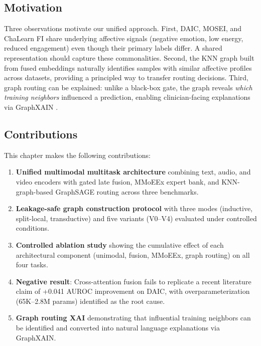 \documentclass[12pt,oneside]{book}
\begin{document}
\subsection{Motivation}

Three observations motivate our unified approach. First, DAIC, MOSEI, and ChaLearn FI share underlying affective signals (negative emotion, low energy, reduced engagement) even though their primary labels differ. A shared representation should capture these commonalities. Second, the KNN graph built from fused embeddings naturally identifies samples with similar affective profiles across datasets, providing a principled way to transfer routing decisions. Third, graph routing can be explained: unlike a black-box gate, the graph reveals \emph{which training neighbors} influenced a prediction, enabling clinician-facing explanations via GraphXAIN \citep{cedro2024graphxain}.

\subsection{Contributions}

This chapter makes the following contributions:

\begin{enumerate}
    \item \textbf{Unified multimodal multitask architecture} combining text, audio, and video encoders with gated late fusion, MMoEEx expert bank, and KNN-graph-based GraphSAGE routing across three benchmarks.

    \item \textbf{Leakage-safe graph construction protocol} with three modes (inductive, split-local, transductive) and five variants (V0--V4) evaluated under controlled conditions.

    \item \textbf{Controlled ablation study} showing the cumulative effect of each architectural component (unimodal, fusion, MMoEEx, graph routing) on all four tasks.

    \item \textbf{Negative result}: Cross-attention fusion fails to replicate a recent literature claim of +0.041 AUROC improvement on DAIC, with overparameterization (65K--2.8M params) identified as the root cause.

    \item \textbf{Graph routing XAI} demonstrating that influential training neighbors can be identified and converted into natural language explanations via GraphXAIN.
\end{enumerate}
\end{document}
